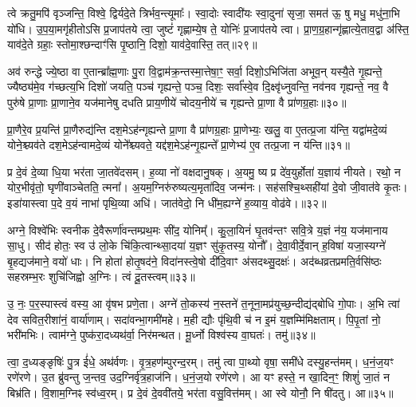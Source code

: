 {\anuvakamend[{उ॒प॒या॒मगृ॑हीतो जुहोमि॒ त्रिच॑त्वारिꣳशच्च॥९॥}]}

त्वे क्रतु॒मपि॑ वृञ्जन्ति॒ विश्वे॒ द्विर्यदे॒ते त्रिर्भव॒न्त्यूमाः᳚। स्वा॒दोः स्वादी॑यः स्वा॒दुना॑ सृजा॒ समत॑ ऊ॒ षु मधु॒ मधु॑ना॒भि यो॑धि। उ॒प॒या॒मगृ॑हीतो\-ऽसि प्र॒जाप॑तये त्वा॒ जुष्टं॑ गृह्णाम्ये॒ष ते॒ योनिः॑ प्र॒जाप॑तये त्वा। प्रा॒ण॒ग्र॒हान्गृ॑ह्णात्ये॒ताव॒द्वा अ॑स्ति॒ याव॑दे॒ते ग्रहाः॒ स्तोमा॒श्छन्दाꣳ॑सि पृ॒ष्ठानि॒ दिशो॒ याव॑दे॒वास्ति॒ तत्॥२९॥

अव॑ रुन्द्धे ज्ये॒ष्ठा वा ए॒तान्ब्रा᳚ह्म॒णाः पु॒रा वि॒द्वाम॑क्र॒न्तस्मा॒त्तेषा॒ꣳ॒ सर्वा॒ दिशो॒\-ऽभिजि॑ता अभूव॒न् यस्यै॒ते गृ॒ह्यन्ते॒ ज्यैष्ठ्य॑मे॒व ग॑च्छत्य॒भि दिशो॑ जयति॒ पञ्च॑ गृह्यन्ते॒ पञ्च॒ दिशः॒ सर्वा᳚स्वे॒व दि॒क्ष्वृ॑ध्नुवन्ति॒ नव॑नव गृह्यन्ते॒ नव॒ वै पुरु॑षे प्रा॒णाः प्रा॒णाने॒व यज॑मानेषु दधति प्राय॒णीये॑ चोदय॒नीये॑ च गृह्यन्ते प्रा॒णा वै प्रा॑णग्र॒हाः॥३०॥

प्रा॒णैरे॒व प्र॒यन्ति॑ प्रा॒णैरुद्य॑न्ति दश॒मे\-ऽह॑न्गृह्यन्ते प्रा॒णा वै प्रा॑णग्र॒हाः प्रा॒णेभ्यः॒ खलु॒ वा ए॒तत्प्र॒जा य॑न्ति॒ यद्वा॑मदे॒व्यं योने॒श्च्यव॑ते दश॒मे\-ऽह॑न्वामदे॒व्यं योने᳚श्च्यवते॒ यद्द॑श॒मे\-ऽह॑न्गृ॒ह्यन्ते᳚ प्रा॒णेभ्य॑ ए॒व तत्प्र॒जा न य॑न्ति॥३१॥

{\anuvakamend[{तत्प्रा॑णग्र॒हाः स॒प्तत्रिꣳ॑शच्च॥10॥}]}

प्र दे॒वं दे॒व्या धि॒या भर॑ता जा॒तवे॑दसम्। ह॒व्या नो॑ वक्षदानु॒षक्। अ॒यमु॒ ष्य प्र दे॑व॒युर्\mbox{}होता॑ य॒ज्ञाय॑ नीयते। रथो॒ न योर॒भीवृ॑तो॒ घृणी॑वाञ्चेतति॒ त्मना᳚। अ॒यम॒ग्निरु॑रुष्यत्य॒मृता॑दिव॒ जन्म॑नः। सह॑सश्चि॒थ्सही॑यां दे॒वो जी॒वात॑वे कृ॒तः। इडा॑यास्त्वा प॒दे व॒यं नाभा॑ पृथि॒व्या अधि॑। जात॑वेदो॒ नि धी॑म॒ह्यग्ने॑ ह॒व्याय॒ वोढ॑वे।॥३२॥

अग्ने॒ विश्वे॑भिः स्वनीक दे॒वैरूर्णा॑वन्तम्प्रथ॒मः सी॑द॒ योनिम्᳚। कु॒ला॒यिनं॑ घृ॒तव॑न्तꣳ सवि॒त्रे य॒ज्ञं न॑य॒ यज॑मानाय सा॒धु। सीद॑ होतः॒ स्व उ॑ लो॒के चि॑कि॒त्वान्थ्सा॒दया॑ य॒ज्ञꣳ सु॑कृ॒तस्य॒ योनौ᳚। दे॒वा॒वीर्दे॒वान् ह॒विषा॑ यजा॒स्यग्ने॑ बृ॒हद्यज॑माने॒ वयो॑ धाः। नि होता॑ होतृ॒षद॑ने॒ विदा॑नस्त्वे॒षो दी॑दि॒वाꣳ अ॑सदथ्सु॒दक्षः॑। अद॑ब्धव्रतप्रमति॒र्वसि॑ष्ठः सहस्रम्भ॒रः शुचि॑जिह्वो अ॒ग्निः। त्वं दू॒तस्त्वम्॥३३॥

उ॒ नः॒ प॒र॒स्पास्त्वं वस्य॒ आ वृ॑षभ प्रणे॒ता। अग्ने॑ तो॒कस्य॑ न॒स्तने॑ त॒नूना॒मप्र॑युच्छ॒न्दीद्य॑द्बोधि गो॒पाः। अ॒भि त्वा॑ देव सवित॒रीशा॑नं॒ वार्या॑णाम्। सदा॑वन्भा॒गमी॑महे। म॒ही द्यौः पृ॑थि॒वी च॑ न इ॒मं य॒ज्ञम्मि॑मिक्षताम्। पि॒पृ॒तां नो॒ भरी॑मभिः। त्वाम॑ग्ने॒ पुष्क॑रा॒दध्यथ॑र्वा॒ निर॑मन्थत। मू॒र्ध्नो विश्व॑स्य वा॒घतः॑। तमु॑॥३४॥

त्वा॒ द॒ध्यङ्ङृषिः॑ पु॒त्र ई॑धे॒ अथ॑र्वणः। वृ॒त्र॒हण॑म्पुरन्द॒रम्। तमु॑ त्वा पा॒थ्यो वृषा॒ समी॑धे दस्यु॒हन्त॑मम्। ध॒नं॒ज॒यꣳ रणे॑रणे। उ॒त ब्रु॑वन्तु ज॒न्तव॒ उद॒ग्निर्वृ॑त्र॒हाज॑नि। ध॒नं॒ज॒यो रणे॑रणे। आ यꣳ हस्ते॒ न खा॒दिन॒ꣳ॒ शिशुं॑ जा॒तं न बिभ्र॑ति। वि॒शाम॒ग्निꣴ स्व॑ध्व॒रम्। प्र दे॒वं दे॒ववी॑तये॒ भर॑ता वसु॒वित्त॑मम्। आ स्वे योनौ॒ नि षी॑दतु। आ॥३५॥


